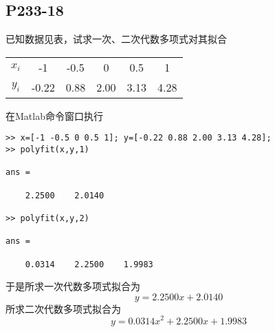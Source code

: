 \subsection{P233-18}
已知数据见表，试求一次、二次代数多项式对其拟合
\begin{center}
\begin{tabular}{c|c c c c c}
$x_i$ & -1    & -0.5 & 0    & 0.5  & 1 \\
$y_i$ & -0.22 & 0.88 & 2.00 & 3.13 & 4.28
\end{tabular}
\end{center}
\begin{SOLVE}
在Matlab命令窗口执行
\begin{lstlisting}
>> x=[-1 -0.5 0 0.5 1]; y=[-0.22 0.88 2.00 3.13 4.28];
>> polyfit(x,y,1)

ans =

    2.2500    2.0140

>> polyfit(x,y,2)

ans =

    0.0314    2.2500    1.9983
\end{lstlisting}
于是所求一次代数多项式拟合为
\begin{displaymath}
y = 2.2500 x + 2.0140
\end{displaymath}
所求二次代数多项式拟合为
\begin{displaymath}
y = 0.0314 x^2 + 2.2500 x + 1.9983
\end{displaymath}
\end{SOLVE}